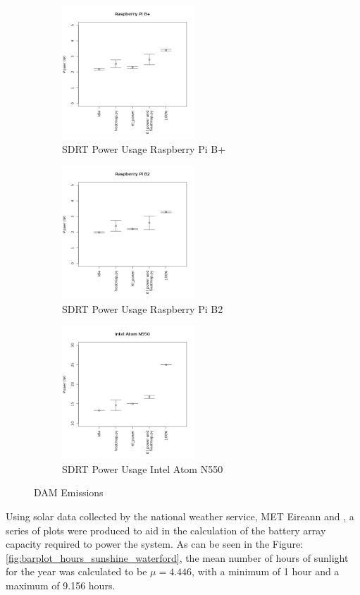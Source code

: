 %
\begin{figure}	
	\centering
	\begin{subfigure}[t]{5cm}
		\centering
		\includegraphics[width=5cm]{images/59}
		\caption{SDRT Power Usage Raspberry Pi B+}
		\label{fig:sdrt_power_usage_pi_b}		
	\end{subfigure}
	\quad
	\begin{subfigure}[t]{5cm}
		\centering
		\includegraphics[width=5cm]{images/60}
		\caption{SDRT Power Usage Raspberry Pi B2}
		\label{fig:sdrt_power_usage_pi_b2}
	\end{subfigure}
	\quad
	\begin{subfigure}[t]{5cm}
		\centering
		\includegraphics[width=5cm]{images/61}
		\caption{SDRT Power Usage Intel Atom N550}
		\label{fig:sdrt_power_usage_atom_n55}
	\end{subfigure}
	\caption{DAM Emissions}
	\label{fig:jupiter_dam}
\end{figure}
%


\newpage
Using solar data collected by the national weather service, MET Eireann \citep{MET-15} and \citep{ECAD-15}, a series of plots were produced to aid in the calculation of the battery array capacity required to power the system. As can be seen in the Figure: \ref{fig:barplot_hours_sunshine_waterford}, the mean number of hours of sunlight for the year was calculated to be $\mu = 4.446$, with a minimum of 1 hour and a maximum of 9.156 hours.

